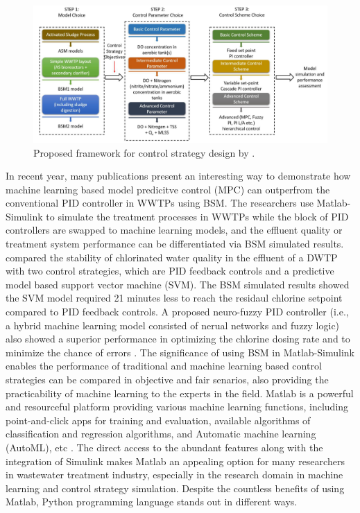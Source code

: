 \begin{figure}[h]
   \centering
   \includegraphics[width=0.9\columnwidth]{imgs/propose-frameworks-for-control-strategy-design.png}
   \caption{Proposed framework for control strategy design by \citet{ballhysaWastewaterTreatmentPlant2020}.}
   \label{fig:control-strategy-design}
\end{figure}
 
In recent year, many publications present an interesting way to demonstrate how machine learning based model predicitve control (MPC) can outperfrom the conventional PID controller in WWTPs using BSM. The researchers use Matlab-Simulink to simulate the treatment processes in WWTPs while the block of PID controllers are swapped to machine learning models, and the effluent quality or treatment system performance can be differentiated via BSM simulated results. \citet{wangModelPredictiveControl2020} compared the stability of chlorinated water quality in the effluent of a DWTP with two control strategies, which are PID feedback controls and a predictive model based support vector machine (SVM). The BSM simulated results showed the SVM model required 21 minutes less to reach the residaul chlorine setpoint compared to PID feedback controls. A proposed neuro-fuzzy PID controller (i.e., a hybrid machine learning model consisted of nerual networks and fuzzy logic) also showed a superior performance in optimizing the chlorine dosing rate and to minimize the chance of errors \citep{hongApplicationNeurofuzzyPID2012}. The significance of using BSM in Matlab-Simulink enables the performance of traditional and machine learning based control strategies can be compared in objective and fair senarios, also providing the practicability of machine learning to the experts in the field. Matlab is a powerful and resourceful platform providing various machine learning functions, including point-and-click apps for training and evaluation, available algorithms of classification and regression algorithms, and Automatic machine learning (AutoML), etc \citep{mathworksMATLABMachineLearning2022}. The direct access to the abundant features along with the integration of Simulink makes Matlab an appealing option for many researchers in wastewater treatment industry, especially in the research domain in machine learning and control strategy simulation. Despite the countless benefits of using Matlab, Python programming language stands out in different ways.

